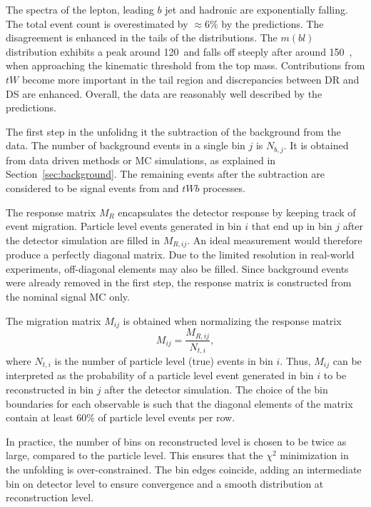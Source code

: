 The \pt spectra of the lepton, leading $b$ jet and hadronic \Wboson are exponentially falling.
The total event count is overestimated by $\approx 6\%$ by the predictions.
The disagreement is enhanced in the tails of the distributions.
The $m(bl)$ distribution
exhibits a peak around 120~\GeV and falls off steeply after around 150~\GeV, when approaching the kinematic threshold from the top mass. Contributions from $tW$ become more important in the tail region and
discrepancies between DR and DS are enhanced.
Overall, the data are reasonably well described by the predictions.

The first step in the unfolidng it the subtraction of the background from the data.
The number of background events in a single bin $j$ is $N_{b,j}$.
It is obtained from data driven methods or MC simulations, as explained in Section~\ref{sec:background}.
The remaining events after the subtraction are considered to be signal events from \ttbar and $tWb$ processes.

The response matrix $M_R$ encapsulates the detector response
by keeping track of event migration.
Particle level events generated in bin $i$ that end up in bin $j$ after the detector simulation
are filled in $M_{R,ij}$. An ideal measurement would therefore produce a perfectly diagonal matrix.
Due to the limited resolution in real-world experiments, off-diagonal elements may also be filled. 
Since background events were already removed in the first step, 
the response matrix is constructed from the nominal signal MC only.

The migration matrix $M_{ij}$ is obtained when normalizing the response matrix
\begin{equation}
    M_{ij} = \frac{M_{R,ij}}{N_{t,i}},
\end{equation}
where $N_{t,i}$ is the number of particle level (true) events in bin $i$.
Thus, $M_{ij}$ can be interpreted as the probability of a particle level event generated in bin $i$ to be reconstructed in bin $j$ after the detector simulation.
The choice of the bin boundaries for each observable is such that the diagonal elements of the matrix contain at least 60\% of particle level events per row.

In practice, the number of bins on reconstructed level is chosen to be twice as large, compared to the particle level.
This ensures that the $\chi^2$ minimization in the unfolding is over-constrained. 
The bin edges coincide, adding an intermediate bin on detector level to ensure convergence and a smooth distribution
at reconstruction level.

